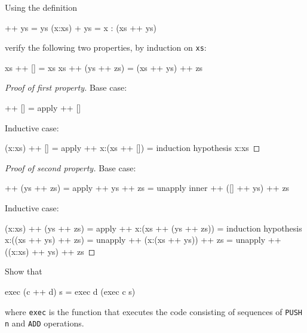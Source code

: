 \documentclass[12pt]{article}
\newenvironment{code}{\endgraf\verbatim}{\endverbatim}
\newenvironment{problem}[2][Problem]{\begin{trivlist}
\item[\hskip \labelsep {\bfseries #1}\hskip \labelsep {\bfseries #2.}]}{\end{trivlist}}
\begin{document}
\begin{problem}{1}
Using the definition

\begin{code}
[] ++ ys = ys
(x:xs) + ys = x : (xs ++ ys)
\end{code}

verify the following two properties, by induction on \verb|xs|:

\begin{code}
xs ++ [] = xs
xs ++ (ys ++ zs) = (xs ++ ys) ++ zs
\end{code}
\end{problem}


\begin{proof}[Proof of first property]
Base case:

\begin{code}
  [] ++ []
=   { apply ++ }
  []
\end{code}

Inductive case:

\begin{code}
  (x:xs) ++ []
=   { apply ++ }
  x:(xs ++ [])
=   { induction hypothesis }
  x:xs
\end{code}
\end{proof}


\begin{proof}[Proof of second property]
Base case:

\begin{code}
  [] ++ (ys ++ zs)
=   { apply ++ }
  ys ++ zs
=   { unapply inner ++ }
  ([] ++ ys) ++ zs
\end{code}

Inductive case:

\begin{code}
  (x:xs) ++ (ys ++ zs)
=   { apply ++ }
  x:(xs ++ (ys ++ zs))
=   { induction hypothesis }
  x:((xs ++ ys) ++ zs)
=   { unapply ++ }
  (x:(xs ++ ys)) ++ zs
=   { unapply ++ }
  ((x:xs) ++ ys) ++ zs
\end{code}
\end{proof}


\begin{problem}{2}
Show that

\begin{code}
exec (c ++ d) s = exec d (exec c s)
\end{code}

where \verb|exec| is the function that executes the code consisting of sequences of \verb|PUSH n| and \verb|ADD| operations.
\end{problem}
\end{document}
